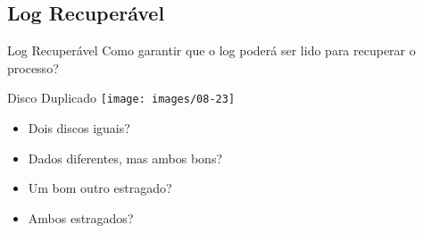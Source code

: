 \subsection{Log Recuperável}
\begin{frame}{Log Recuperável}
Como garantir que o log poderá ser lido para recuperar o processo?
\end{frame}

\begin{frame}{Disco Duplicado}
\texttt{[image: images/08-23]}

\begin{itemize}
	\item Dois discos iguais?
	\item Dados diferentes, mas ambos bons?
	\item Um bom outro estragado?
	\item Ambos estragados?
\end{itemize}
\end{frame}

